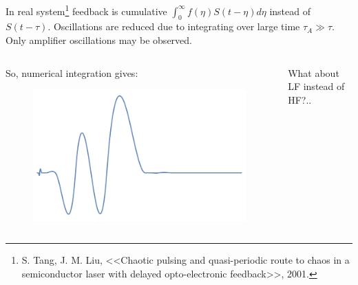 In real system\footnote{
    S. Tang, J. M. Liu, <<Chaotic pulsing and quasi-periodic route to chaos in a semiconductor laser with delayed opto-electronic feedback>>, 2001.
} feedback is cumulative $ \int_{0}^{\infty} f(\eta) S(t-\eta)d\eta$ instead of $S(t-\tau)$. Oscillations are reduced due to integrating over large time $\tau_{A} \gg \tau$. Only amplifier oscillations may be observed.
 

 \begin{columns}
 	\begin{column}{.5\linewidth}
 		 So, numerical integration gives:
		 \begin{figure}
			\centering
			\includegraphics[width=.9\linewidth]{figures/int_oscillations.pdf}
		\end{figure}
 	\end{column}
 
 	\begin{column}{.5\linewidth}
 		What about LF instead of HF?..
 		\begin{itemize}
 		\end{itemize}
	\end{column}
	\end{columns}
